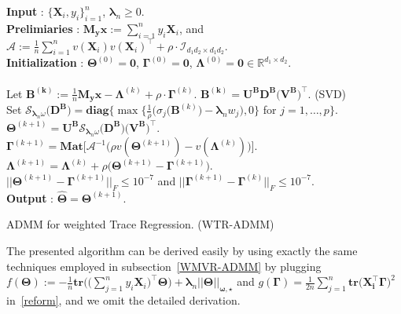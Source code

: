 \documentclass[alpha-refs]{wiley-article}
\begin{document}
\begin{algorithm}[hbt!]
    \textbf{Input} : $\big\{\boldsymbol{X}_{i},y_{i}\big\}_{i=1}^{n}$, $\boldsymbol{\lambda}_{n} \geq 0$. \\
    \textbf{Prelimiaries} : $\boldsymbol{M_{y}x}:=\sum_{i=1}^{n}y_{i}\boldsymbol{X}_{i}$, and
    $\mathcal{A} := \frac{1}{n}\sum_{i=1}^{n} v(\boldsymbol{X}_{i})v(\boldsymbol{X}_{i})^{\top}+\rho\cdot\mathcal{I}_{ d_1d_2 \times d_1d_2}$. \\
    \textbf{Initialization} : $\boldsymbol{\Theta}^{(0)}=\boldsymbol{0}$, $\boldsymbol{\Gamma}^{(0)}=\boldsymbol{0}$, $\boldsymbol{\Lambda}^{(0)}=\boldsymbol{0} \in\mathbb{R}^{d_{1}\times d_{2}}$. \\
     \\
    \qquad {} Let $\boldsymbol{B^{(k)}}:=\frac{1}{n}\boldsymbol{M_{y}x}-\boldsymbol{\Lambda}^{(k)}+\rho \cdot \boldsymbol{\Gamma}^{(k)}$. \quad $\boldsymbol{B^{(k)}}=\boldsymbol{U}^{\textbf{B}}\boldsymbol{D}^{\textbf{B}}\big(\boldsymbol{V^{\textbf{B}}}\big)^{\top}$. (SVD) \\
    \qquad \qquad \qquad \qquad  Set $\mathcal{S}_{\boldsymbol{\lambda}_{n}\omega}\big(\boldsymbol{D}^{\textbf{B}}\big) = \textbf{diag}\bigg\{ \max\bigg\{\frac{1}{\rho}\big(\sigma_{j}(\boldsymbol{B}^{(k)}\big)-\boldsymbol{\lambda}_{n} w_{j}\big),0 \bigg\}$ for $j=1,\dots,p \bigg\}$.  \\
    \qquad \qquad \qquad \qquad $\boldsymbol{\Theta}^{(k+1)} = \boldsymbol{U}^{\textbf{B}} \mathcal{S}_{\boldsymbol{\lambda}_{n}\omega}\big(\boldsymbol{D}^{\textbf{B}}\big) \big(\boldsymbol{V^{\textbf{B}}}\big)^{\top}$.  \\
    \qquad {}
    $\boldsymbol{\Gamma}^{(k+1)} = \textbf{Mat} \big[\mathcal{A}^{-1}\big(\rho v(\boldsymbol{\Theta}^{(k+1)})-v(\boldsymbol{\Lambda}^{(k)})\big)\big].$\\
    \qquad {} $\boldsymbol{\Lambda}^{(k+1)} = \boldsymbol{\Lambda}^{(k)} + \rho\big( \boldsymbol{\Theta}^{(k+1)}-\boldsymbol{\Gamma}^{(k+1)} \big)$.\\
     $|| \boldsymbol{\Theta}^{(k+1)}-\boldsymbol{\Gamma}^{(k+1)} ||_{F}\leq 10^{-7}$ and $|| \boldsymbol{\Gamma}^{(k+1)}-\boldsymbol{\Gamma}^{(k)} ||_{F}\leq 10^{-7}$. \\
    \textbf{Output} : $\widehat{\boldsymbol{\Theta}}=\boldsymbol{\Theta}^{(k+1)}$.
    \caption{ADMM for weighted Trace Regression. (WTR-ADMM)}
    \label{trace_algo}
\end{algorithm}
The presented algorithm can be derived easily by using exactly the same techniques employed in subsection~\ref{WMVR-ADMM} by plugging $f(\boldsymbol{\Theta}):=-\frac{1}{n}\textbf{tr}\big( \big(\sum_{j=1}^{n}y_{i}\boldsymbol{X}_{i}\big)^{\top}\boldsymbol{\Theta} \big)+\boldsymbol{\lambda}_{n}||\boldsymbol{\Theta}||_{\boldsymbol{\omega,\star}}$ and $g(\boldsymbol{\Gamma})=\frac{1}{2n}\sum_{j=1}^{n}\textbf{tr}\big(\boldsymbol{X_i^\top}\boldsymbol{\Gamma}\big)^{2}$ in~\eqref{reform},
and we omit the detailed derivation.
\end{document}
